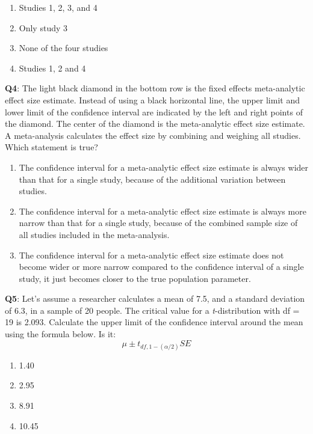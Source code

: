 \documentclass[
]{krantz}
\providecommand{\tightlist}{%
  \setlength{\itemsep}{0pt}\setlength{\parskip}{0pt}}
\begin{document}
\begin{enumerate}
\def\labelenumi{\Alph{enumi})}
\tightlist
\item
  Studies 1, 2, 3, and 4
\item
  Only study 3
\item
  None of the four studies
\item
  Studies 1, 2 and 4
\end{enumerate}

\textbf{Q4}: The light black diamond in the bottom row is the fixed effects meta-analytic effect size estimate. Instead of using a black horizontal line, the upper limit and lower limit of the confidence interval are indicated by the left and right points of the diamond. The center of the diamond is the meta-analytic effect size estimate. A meta-analysis calculates the effect size by combining and weighing all studies. Which statement is true?

\begin{enumerate}
\def\labelenumi{\Alph{enumi})}
\tightlist
\item
  The confidence interval for a meta-analytic effect size estimate is always wider than that for a single study, because of the additional variation between studies.
\item
  The confidence interval for a meta-analytic effect size estimate is always more narrow than that for a single study, because of the combined sample size of all studies included in the meta-analysis.
\item
  The confidence interval for a meta-analytic effect size estimate does not become wider or more narrow compared to the confidence interval of a single study, it just becomes closer to the true population parameter.
\end{enumerate}

\textbf{Q5}: Let's assume a researcher calculates a mean of 7.5, and a standard deviation of 6.3, in a sample of 20 people. The critical value for a \emph{t}-distribution with df = 19 is 2.093. Calculate the upper limit of the confidence interval around the mean using the formula below. Is it:
\[
\mu \pm t_{df, 1-(\alpha/2)} SE
\]

\begin{enumerate}
\def\labelenumi{\Alph{enumi})}
\tightlist
\item
  1.40
\item
  2.95
\item
  8.91
\item
  10.45
\end{enumerate}
\end{document}
